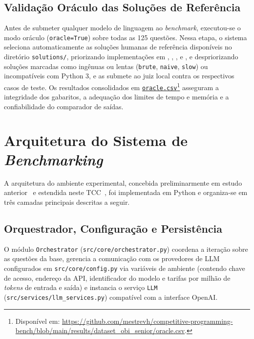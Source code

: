 \subsection{Validação Oráculo das Soluções de Referência}\label{sec:met-oraculo}

Antes de submeter qualquer modelo de linguagem ao \textit{benchmark}, executou-se o modo oráculo (\texttt{oracle=True}) sobre todas as 125 questões. Nessa etapa, o sistema seleciona automaticamente as soluções humanas de referência disponíveis no diretório \texttt{solutions/}, priorizando implementações em , , ,  e , e despriorizando soluções marcadas como ingênuas ou lentas (\texttt{brute}, \texttt{naive}, \texttt{slow}) ou incompatíveis com Python 3, e as submete ao juiz local contra os respectivos casos de teste. Os resultados consolidados em \href{https://github.com/mestrevh/competitive-programming-bench/blob/main/results/dataset_obi_senior/oracle.csv}{\texttt{oracle.csv}}\footnote{Disponível em: \url{https://github.com/mestrevh/competitive-programming-bench/blob/main/results/dataset_obi_senior/oracle.csv}.} asseguram a integridade dos gabaritos, a adequação dos limites de tempo e memória e a confiabilidade do comparador de saídas.

\section{Arquitetura do Sistema de \textit{Benchmarking}}\label{sec:met-arquitetura}

A arquitetura do ambiente experimental, concebida preliminarmente em estudo anterior~\citep{angelo2026ise} e estendida neste TCC~\citep{obibenchmarking2026}, foi implementada em Python e organiza-se em três camadas principais descritas a seguir.

\subsection{Orquestrador, Configuração e Persistência}\label{sec:met-orchestrator}

O módulo \texttt{Orchestrator} (\texttt{src/core/orchestrator.py}) coordena a iteração sobre as questões da base, gerencia a comunicação com os provedores de LLM configurados em \texttt{src/core/config.py} via variáveis de ambiente (contendo chave de acesso, endereço da API, identificador do modelo e tarifas por milhão de \textit{tokens} de entrada e saída) e instancia o serviço \texttt{LLM} (\texttt{src/services/llm\_services.py}) compatível com a interface OpenAI.

